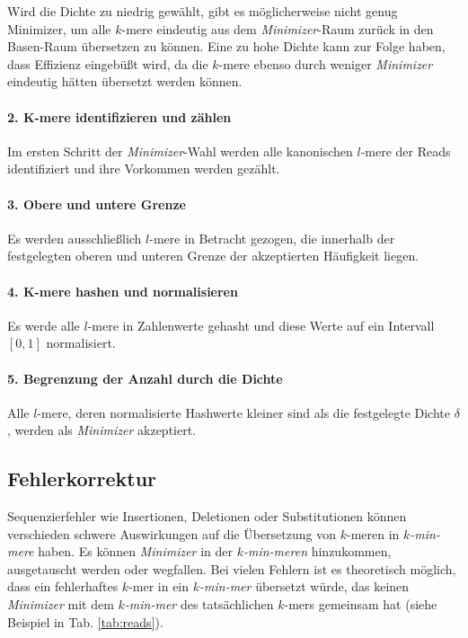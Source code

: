 \documentclass[a4paper, 11pt]{article}
\begin{document}
Wird die Dichte zu niedrig gewählt, gibt es möglicherweise nicht genug Minimizer, um alle $k$-mere eindeutig aus dem \textit{Minimizer}-Raum zurück in den Basen-Raum übersetzen zu können. Eine zu hohe Dichte kann zur Folge haben, dass Effizienz eingebüßt wird, da die $k$-mere ebenso durch weniger \textit{Minimizer} eindeutig hätten übersetzt werden können.  

\paragraph{2. K-mere identifizieren und zählen} Im ersten Schritt der \textit{Minimizer}-Wahl werden alle kanonischen $l$-mere der Reads identifiziert und ihre Vorkommen werden gezählt. 

\paragraph{3. Obere und untere Grenze} Es werden ausschließlich $l$-mere in Betracht gezogen, die innerhalb der festgelegten oberen und unteren Grenze der akzeptierten Häufigkeit liegen. 

\paragraph{4. K-mere hashen und normalisieren} Es werde alle $l$-mere in Zahlenwerte gehasht und diese Werte auf ein Intervall $[0,1]$ normalisiert. 

\paragraph{5. Begrenzung der Anzahl durch die Dichte}
Alle $l$-mere, deren normalisierte Hashwerte kleiner sind als die festgelegte Dichte $\delta$, werden als \textit{Minimizer} akzeptiert. 


\subsection{Fehlerkorrektur}
Sequenzierfehler wie Insertionen, Deletionen oder Substitutionen können verschieden schwere Auswirkungen auf die Übersetzung von $k$-meren in \textit{$k$-min-mere} haben. Es können \textit{Minimizer} in der \textit{$k$-min-meren} hinzukommen, ausgetauscht werden oder wegfallen. Bei vielen Fehlern ist es theoretisch möglich, dass ein fehlerhaftes $k$-mer in ein \textit{$k$-min-mer} übersetzt würde, das keinen \textit{Minimizer} mit dem \textit{$k$-min-mer} des tatsächlichen $k$-mers gemeinsam hat (siehe Beispiel in Tab. \ref{tab:reads}). 
\end{document}
